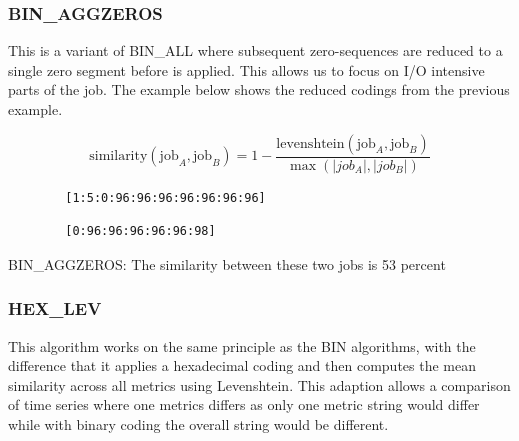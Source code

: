 \documentclass{jhps}
\begin{document}
\subsubsection{BIN\_AGGZEROS}
This is a variant of BIN\_ALL where subsequent zero-sequences are reduced to a single zero segment before  is applied.
This allows us to focus on I/O intensive parts of the job.
The example below shows the reduced codings from the previous example.

\begin{equation}
	\text{similarity} \left(\text{job}_{A},\text{job}_{B} \right) =1- \frac{\text{levenshtein} \left(\text{job}_{A},\text{job}_{B} \right) }{\max \left( |job_{A}|,|job_{B}| \right) } \label{eq:sim:bin_aggzeros}
\end{equation}


\begin{listing}
	\noindent\begin{minipage}{0.49\textwidth}
		\begin{lstlisting}
		[1:5:0:96:96:96:96:96:96:96]
		\end{lstlisting}
		\vspace{-2em}
		\label{lst:sim:bin_aggzeros:job_a}
	\end{minipage}
	\noindent\begin{minipage}{0.49\textwidth}
		\begin{lstlisting}
		[0:96:96:96:96:96:98]
		\end{lstlisting}
		\vspace{-2em}
		\label{lst:sim:bin_aggzeros:job_b}
	\end{minipage}
	\caption{BIN\_AGGZEROS: The similarity between these two jobs is 53 percent}
	\label{lst:sim:bin_aggzeros}
\end{listing}

  \subsubsection{HEX\_LEV}
This algorithm works on the same principle as the BIN algorithms, with the difference that it applies a hexadecimal coding and then computes the mean similarity across all metrics using Levenshtein.
This adaption allows a comparison of time series where one metrics differs as only one metric string would differ while with binary coding the overall string would be different.
\end{document}
